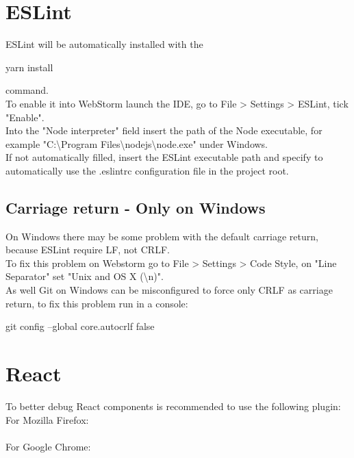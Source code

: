 \documentclass[ManualeSviluppatore.tex]{subfiles}
\begin{document}
\section{ESLint}
ESLint will be automatically installed with the \begin{ttfamily}yarn install \end{ttfamily}command. \\
To enable it into WebStorm launch the IDE, go to File \textgreater{} Settings \textgreater{} ESLint, tick "Enable". \\
Into the "Node interpreter" field insert the path of the Node executable, for example "C:\textbackslash Program Files\textbackslash nodejs\textbackslash node.exe" under Windows. \\
If not automatically filled, insert the ESLint executable path and specify to automatically use the .eslintrc configuration file in the project root.

\subsection{Carriage return - Only on Windows}
On Windows there may be some problem with the default carriage return, because ESLint require LF, not CRLF. \\
To fix this problem on Webstorm go to File \textgreater{} Settings \textgreater{} Code Style, on "Line Separator" set "Unix and OS X (\textbackslash{}n)". \\
As well Git on Windows can be misconfigured to force only CRLF as carriage return, to fix this problem run in a console: \\
\begin{ttfamily}git config --global core.autocrlf false \end{ttfamily}

\section{React}
To better debug React components is recommended to use the following plugin: \\
For Mozilla Firefox: \\
 \\
For Google Chrome: \\
 \\
\end{document}
